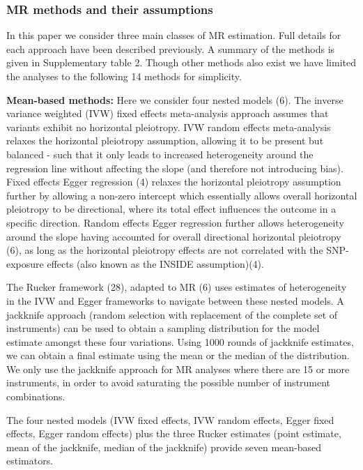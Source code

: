 \documentclass[]{article}
\begin{document}
\subsubsection{MR methods and their
assumptions}\label{mr-methods-and-their-assumptions}

In this paper we consider three main classes of MR estimation. Full
details for each approach have been described previously. A summary of
the methods is given in Supplementary table 2. Though other methods also
exist we have limited the analyses to the following 14 methods for
simplicity.

\textbf{Mean-based methods:} Here we consider four nested models (6).
The inverse variance weighted (IVW) fixed effects meta-analysis approach
assumes that variants exhibit no horizontal pleiotropy. IVW random
effects meta-analysis relaxes the horizontal pleiotropy assumption,
allowing it to be present but balanced - such that it only leads to
increased heterogeneity around the regression line without affecting the
slope (and therefore not introducing bias). Fixed effects Egger
regression (4) relaxes the horizontal pleiotropy assumption further by
allowing a non-zero intercept which essentially allows overall
horizontal pleiotropy to be directional, where its total effect
influences the outcome in a specific direction. Random effects Egger
regression further allows heterogeneity around the slope having
accounted for overall directional horizontal pleiotropy (6), as long as
the horizontal pleiotropy effects are not correlated with the
SNP-exposure effects (also known as the INSIDE assumption)(4).

The Rucker framework (28), adapted to MR (6) uses estimates of
heterogeneity in the IVW and Egger frameworks to navigate between these
nested models. A jackknife approach (random selection with replacement
of the complete set of instruments) can be used to obtain a sampling
distribution for the model estimate amongst these four variations. Using
1000 rounds of jackknife estimates, we can obtain a final estimate using
the mean or the median of the distribution. We only use the jackknife
approach for MR analyses where there are 15 or more instruments, in
order to avoid saturating the possible number of instrument
combinations.

The four nested models (IVW fixed effects, IVW random effects, Egger
fixed effects, Egger random effects) plus the three Rucker estimates
(point estimate, mean of the jackknife, median of the jackknife) provide
seven mean-based estimators.
\end{document}
